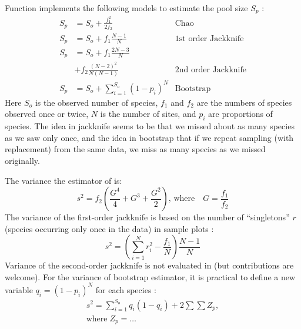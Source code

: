 \documentclass[a4paper,10pt,twocolumn]{article}
\begin{document}
Function  implements the following models to estimate
the pool size $S_p$ \citep{SmithVanBelle84, Chao87}:
\begin{align}
S_p &= S_o + \frac{f_1^2}{2 f_2} & \text{Chao}\\
S_p &= S_o + f_1 \frac{N-1}{N}  & \text{1st order Jackknife}\\
S_p & = S_o + f_1 \frac{2N-3}{N} \nonumber \\ & + f_2 \frac{(N-2)^2}{N(N-1)}
& \text{2nd order Jackknife}\\
S_p &= S_o + \sum_{i=1}^{S_o} (1-p_i)^N & \text{Bootstrap}
\end{align}
Here $S_o$ is the observed number of species, $f_1$ and $f_2$ are the
numbers of species observed once or twice, $N$ is the number of sites,
and $p_i$ are proportions of species.  The idea in jackknife seems to
be that we missed about as many species as we saw only once, and the
idea in bootstrap that if we repeat sampling (with replacement) from
the same data, we miss as many species as we missed originally.

The variance the estimator of \citet{Chao87} is:
\begin{equation}
s^2 = f_2 \left(\frac{G^4}{4} + G^3 + \frac{G^2}{2} \right), \,
\text{where}\quad G = \frac{f_1}{f_2}
\end{equation}
The variance of the first-order jackknife is based on the number of
``singletons'' $r$ (species occurring only once in the data) in sample
plots \citep{SmithVanBelle84}:
\begin{equation}
s^2 = \left(\sum_{i=1}^N r_i^2 - \frac{f_1}{N}\right) \frac{N-1}{N}
\end{equation}
Variance of the second-order jackknife is not evaluated in
 (but contributions are welcome).
For the variance of bootstrap estimator, it is practical to define a
new variable $q_i = (1-p_i)^N$ for each species \citep{SmithVanBelle84}:
\begin{multline}
s^2 = \sum_{i=1}^{S_o} q_i (1-q_i) + 2 \sum \sum Z_p ,\\ \text{where}\; Z_p = \dots
\end{multline}
\end{document}
